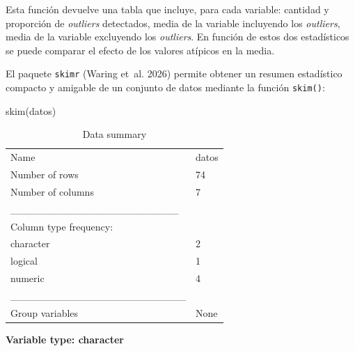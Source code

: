\documentclass[
  spanish,
  a4paper,
]{scrbook}
\newenvironment{Shaded}{\begin{snugshade}}{\end{snugshade}}
\newcommand{\FunctionTok}[1]{\textcolor[rgb]{0.28,0.35,0.67}{#1}}
\newcommand{\NormalTok}[1]{\textcolor[rgb]{0.00,0.23,0.31}{#1}}
\begin{document}
Esta función devuelve una tabla que incluye, para cada variable:
cantidad y proporción de \emph{outliers} detectados, media de la
variable incluyendo los \emph{outliers}, media de la variable excluyendo
los \emph{outliers}. En función de estos dos estadísticos se puede
comparar el efecto de los valores atípicos en la media.

El paquete \texttt{skimr} (Waring et~al. 2026) permite obtener un
resumen estadístico compacto y amigable de un conjunto de datos mediante
la función \texttt{skim()}:

\begin{Shaded}
\begin{Highlighting}[]
\FunctionTok{skim}\NormalTok{(datos)}
\end{Highlighting}
\end{Shaded}

\begin{longtable}[]{@{}ll@{}}
\caption{Data summary}\tabularnewline
\toprule\noalign{}
\endfirsthead
\endhead
\bottomrule\noalign{}
\endlastfoot
Name & datos \\
Number of rows & 74 \\
Number of columns & 7 \\
\_\_\_\_\_\_\_\_\_\_\_\_\_\_\_\_\_\_\_\_\_\_\_ & \\
Column type frequency: & \\
character & 2 \\
logical & 1 \\
numeric & 4 \\
\_\_\_\_\_\_\_\_\_\_\_\_\_\_\_\_\_\_\_\_\_\_\_\_ & \\
Group variables & None \\
\end{longtable}

\textbf{Variable type: character}
\end{document}
